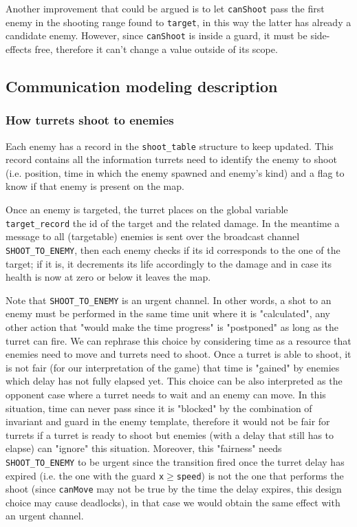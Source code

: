 \documentclass[
10pt, %
a4paper, %
oneside, %
headinclude,footinclude, %
BCOR5mm, %
]{scrartcl}
\begin{document}
				Another improvement that could be argued is to let \texttt{canShoot} pass the first enemy in the shooting range found to \texttt{target}, in this way the latter has already a candidate enemy. However, since \texttt{canShoot} is inside a guard, it must be side-effects free, therefore it can't change a value outside of its scope.
		\subsection{Communication modeling description}
			\subsubsection{How turrets shoot to enemies}
				Each enemy has a record in the \texttt{shoot\_table} structure to keep updated. This record contains all the information turrets need to identify the enemy to shoot (i.e. position, time in which the enemy spawned and enemy's kind) and a flag to know if that enemy is present on the map.
				
				Once an enemy is targeted, the turret places on the global variable \texttt{target\_record} the id of the target and the related damage. In the meantime a message to all (targetable) enemies is sent over the broadcast channel \texttt{SHOOT\_TO\_ENEMY}, then each enemy checks if its id corresponds to the one of the target; if it is, it decrements its life accordingly to the damage and in case its health is now at zero or below it leaves the map.
				
				Note that \texttt{SHOOT\_TO\_ENEMY} is an urgent channel. In other words, a shot to an enemy must be performed in the same time unit where it is "calculated", any other action that "would make the time progress" is "postponed" as long as the turret can fire. We can rephrase this choice by considering time as a resource that enemies need to move and turrets need to shoot. Once a turret is able to shoot, it is not fair (for our interpretation of the game) that time is "gained" by enemies which delay has not fully elapsed yet. This choice can be also interpreted as the opponent case where a turret needs to wait and an enemy can move. In this situation, time can never pass since it is "blocked" by the combination of invariant and guard in the enemy template, therefore it would not be fair for turrets if a turret is ready to shoot but enemies (with a delay that still has to elapse) can "ignore" this situation. Moreover, this "fairness" needs \texttt{SHOOT\_TO\_ENEMY} to be urgent since the transition fired once the turret delay has expired (i.e. the one with the guard \texttt{x$\geq$speed}) is not the one that performs the shoot (since \texttt{canMove} may not be true by the time the delay expires, this design choice may cause deadlocks), in that case we would obtain the same effect with an urgent channel.
\end{document}
